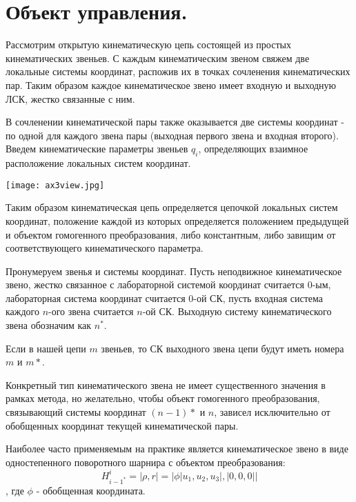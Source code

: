 \section{Объект управления.}

Рассмотрим открытую кинематическую цепь состоящей из простых кинематических звеньев. С каждым кинематическим звеном свяжем две локальные системы координат, распожив их в точках сочленения кинематических пар. Таким образом каждое кинематическое звено имеет входную и выходную ЛСК, жестко связанные с ним.

В сочленении кинематической пары также оказывается две системы координат - по одной для каждого звена пары (выходная первого звена и входная второго). Введем кинематические параметры звеньев $q_i$, определяющих взаимное расположение локальных систем координат.

\begin{center}
  \texttt{[image: ax3view.jpg]}
  \label{}
\end{center}

Таким образом кинематическая цепь определяется цепочкой локальных систем координат, положение каждой из которых определяется положением предыдущей и объектом гомогенного преобразования, либо константным, либо завищим от соответствующего кинематического параметра.

Пронумеруем звенья и системы координат. Пусть неподвижное кинематическое звено, жестко связанное с лабораторной системой координат считается 0-ым, лабораторная система координат считается 0-ой СК, пусть входная система каждого $n$-ого звена считается $n$-ой СК. Выходную систему кинематического звена обозначим как $n^*$. 

Если в нашей цепи $m$ звеньев, то СК выходного звена цепи будут иметь номера $m$ и $m*$.

Конкретный тип кинематического звена не имеет существенного значения в рамках метода, но желательно, чтобы объект гомогенного преобразования, связывающий системы координат $(n-1)*$ и $n$, зависел исключительно от обобщенных координат текущей кинематической пары.

Наиболее часто применяемым на практике является кинематическое звено в виде одностепенного поворотного шарнира с объектом преобразования:
\begin{equation}
H^i_{{i-1}^*} = |\rho, r| = |\phi|u_1, u_2, u_3|, |0, 0, 0||
\end{equation}, где $\phi$ - обобщенная координата.

